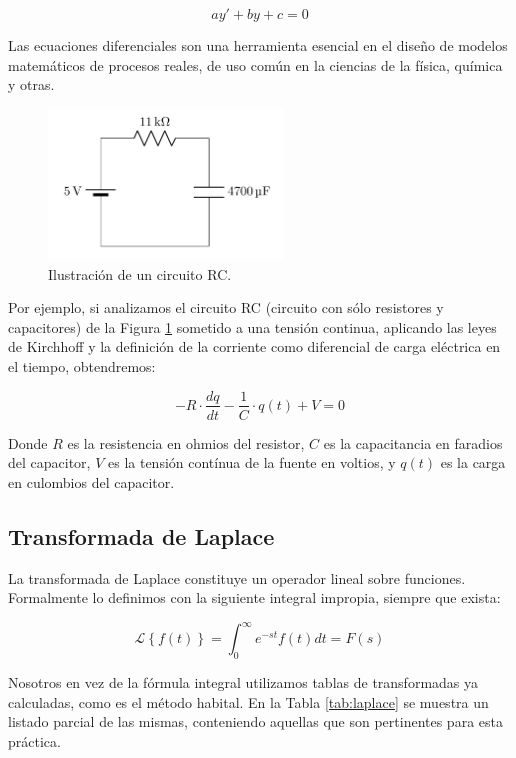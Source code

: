 \documentclass[a4paper]{article}
\begin{document}
\begin{equation}
    ay' + by + c = 0
    \label{eq:general}   
\end{equation}

Las ecuaciones diferenciales son una herramienta esencial en el 
diseño de modelos matemáticos de procesos reales, de uso común en
la ciencias de la física, química y otras. 

\begin{figure}[h]\centering
    \includegraphics[height=4cm]{circuito.png}
    \caption{Ilustración de un circuito RC.}
    \label{fig:circuito}
\end{figure}

Por ejemplo, si analizamos el circuito RC (circuito con sólo 
resistores y capacitores) de la Figura \ref{fig:circuito} sometido 
a una tensión continua, aplicando las leyes de 
Kirchhoff y la definición de la corriente como diferencial de 
carga eléctrica en el tiempo, obtendremos:

\begin{equation}
    - R \cdot \frac{dq}{dt} - \frac{1}{C} \cdot q(t) + V = 0
    \label{eq:circuito}
\end{equation}

Donde $R$ es la resistencia en ohmios del resistor, $C$ es 
la capacitancia en faradios del capacitor, $V$ es la tensión
contínua de la fuente en voltios, y $q(t)$ es la carga en 
culombios del capacitor.

\subsection*{Transformada de Laplace}

La transformada de Laplace constituye un operador lineal sobre
funciones. Formalmente lo definimos con la siguiente integral 
impropia, siempre que exista:

\begin{equation}
    \mathcal{L}\left\{ f(t) \right\} 
    = \int_{0}^{\infty} e^{-st}f(t)dt=F(s)
\end{equation}

Nosotros en vez de la fórmula integral utilizamos tablas de
transformadas ya calculadas, como es el método habital. En la Tabla 
\ref{tab:laplace} se muestra un listado parcial de las mismas, 
conteniendo aquellas que son pertinentes para esta práctica.
\end{document}
